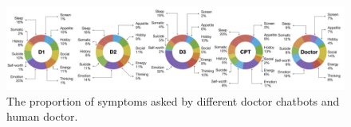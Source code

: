
\begin{figure}[th]
	\centering
	\includegraphics[width=\linewidth]{Figures/topics.png}
	\caption{The proportion of symptoms asked by different doctor chatbots and human doctor.}
	\label{fig:symp_anno}
\end{figure}



